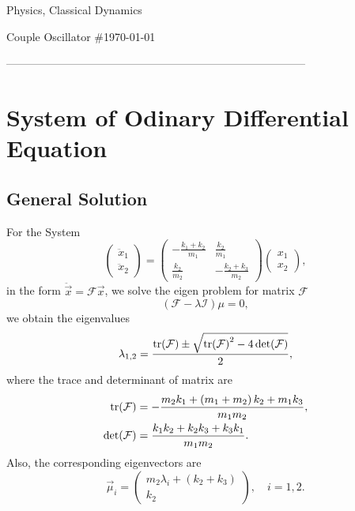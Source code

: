 \documentclass[12pt]{article}%
\begin{document}
\begin{center}
{\Large Physics, Classical Dynamics

Couple Oscillator  \#\today 

---------------------------------------------------------------------------------}
\end{center}
	\section{System of Odinary Differential Equation}
	\subsection{General Solution}
	For the System
	 \begin{equation}
	 \begin{pmatrix}\ddot{x}_1\\\ddot{x}_2\end{pmatrix}
	 =
	 \begin{pmatrix}
	 \displaystyle - \frac{k_1+k_2}{m_1}	&\displaystyle  \frac{k_2}{m_1}\\[2ex]
	 \displaystyle  \frac{k_2}{m_2} 		&\displaystyle  -\frac{k_2+k_3}{m_2}
	 \end{pmatrix}
	 \begin{pmatrix}x_1\\x_2\end{pmatrix},
	 \end{equation}
	 in the form $\ddot{\vec{x}} = \mathcal{F} \vec{x}$, we solve the eigen problem for matrix $\mathcal{F}$
	  \begin{equation}
	 \left(\mathcal{F}-\lambda\mathcal{I}\right)\mu = 0,
	 \end{equation}
	 we obtain the eigenvalues
	  \begin{equation}
	 \lambda_{1,2} = \frac{\tr(\mathcal{F}) \pm \sqrt{\tr(\mathcal{F})^2-4\det({\mathcal{F}})}}{2},
	 \end{equation}
	 where the trace and determinant of matrix are
	 \begin{equation}
	 \begin{aligned}
	 \tr(\mathcal{F}) &=-\frac{m_2k_1+\left(m_1+m_2\right)k_2+m_1k_3}{m_1m_2},\\
	  \det(\mathcal{F}) &=\frac{k_1k_2+k_2k_3+k_3k_1}{m_1m_2}.
	 \end{aligned}
	 \end{equation}
	 Also, the corresponding eigenvectors are
	 \begin{equation}
	\vec{\mu}_{i} = \begin{pmatrix}
	  	\displaystyle  m_2 \lambda_{i}+ \left(k_2+k_3\right)\\
		\displaystyle  k_2
		\end{pmatrix},\quad i =1,2.
	\end{equation}
\end{document}
